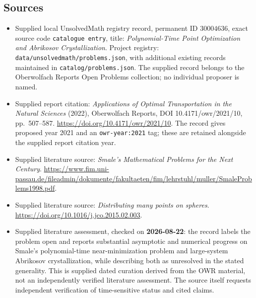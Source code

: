 \documentclass[11pt]{article}
\begin{document}
\subsection{Sources}
\begin{itemize}
\item Supplied local UnsolvedMath registry record, permanent ID \(30004636\), exact source code \texttt{catalogue entry}, title: \emph{Polynomial-Time Point Optimization and Abrikosov Crystallization}. Project registry: \texttt{data/unsolvedmath/problems.json}, with additional existing records maintained in \texttt{catalog/problems.json}. The supplied record belongs to the Oberwolfach Reports Open Problems collection; no individual proposer is named.
\item Supplied report citation: \emph{Applications of Optimal Transportation in the Natural Sciences} (2022), Oberwolfach Reports, DOI 10.4171/owr/2021/10, pp.\ 507--587. \url{https://doi.org/10.4171/owr/2021/10}. The record gives proposed year 2021 and an \texttt{owr-year:2021} tag; these are retained alongside the supplied report citation year.
\item Supplied literature source: \emph{Smale's Mathematical Problems for the Next Century}. \url{https://www.fim.uni-passau.de/fileadmin/dokumente/fakultaeten/fim/lehrstuhl/muller/SmaleProblems1998.pdf}.
\item Supplied literature source: \emph{Distributing many points on spheres}. \url{https://doi.org/10.1016/j.jco.2015.02.003}.
\item Supplied literature assessment, checked on \textbf{2026-08-22}: the record labels the problem open and reports substantial asymptotic and numerical progress on Smale's polynomial-time near-minimization problem and large-system Abrikosov crystallization, while describing both as unresolved in the stated generality. This is supplied dated curation derived from the OWR material, not an independently verified literature assessment. The source itself requests independent verification of time-sensitive status and cited claims.
\end{itemize}
\end{document}
